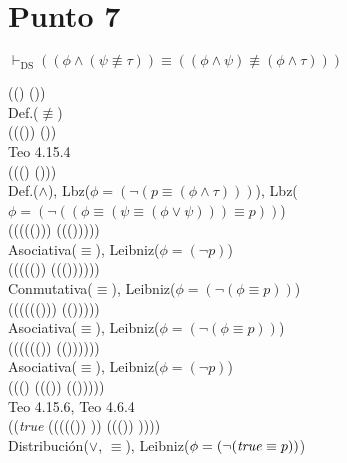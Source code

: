 \documentclass{article}
\begin{document}
\section{Punto 7}
\begin{logicenv}[2]{$\vdash_{\text{DS}} ((\phi \land (\psi \not\equiv \tau)) \equiv ((\phi \land \psi) \not\equiv (\phi \land \tau)))$}
    \begin{derivation}
            ((\phi \land \psi) \not\equiv (\phi \land \tau))\\
        Def.($\not\equiv$)\\
            ((\neg (\phi \land \psi)) \equiv (\phi \land \tau))\\
        Teo 4.15.4\\
            (\neg ((\phi \land \psi) \equiv (\phi \land \psi)))\\
        Def.($\land$), Lbz($\phi = (\neg (p \equiv (\phi \land \tau)))$), Lbz($\phi = (\neg ((\phi \equiv (\psi \equiv (\phi \lor \psi))) \equiv p))$)\\
            (\neg ((\phi \equiv (\psi \equiv (\phi \lor \psi))) \equiv (\phi \equiv (\tau \equiv (\phi \lor \tau)))))\\
        Asociativa($\equiv$), Leibniz($\phi = (\neg p)$)\\
            (\neg (\phi \equiv ((\psi \equiv (\phi \lor \psi)) \equiv (\phi \equiv (\tau \equiv (\phi \lor \tau))))))\\
        Conmutativa($\equiv$), Leibniz($\phi = (\neg (\phi \equiv p))$)\\
            (\neg (\phi \equiv ((\phi \equiv (\tau \equiv (\phi \lor \tau))) \equiv (\psi \equiv (\phi \lor \psi)))))\\
        Asociativa($\equiv$), Leibniz($\phi = (\neg (\phi \equiv p))$)\\
            (\neg (\phi \equiv (\phi \equiv ((\tau \equiv (\phi \lor \tau)) \equiv (\psi \equiv (\phi \lor \psi))))))\\
        Asociativa($\equiv$), Leibniz($\phi = (\neg p)$)\\
            (\neg ((\phi \equiv \phi) \equiv ((\tau \equiv (\phi \lor \tau)) \equiv (\psi \equiv (\phi \lor \psi)))))\\
        Teo 4.15.6, Teo 4.6.4\\
            (\neg (\textrm{\textit{true}} \equiv ((\tau \equiv ((\neg (\neg \phi)) \lor \tau)) \equiv (\psi \equiv (\neg (\neg \phi)) \lor \psi))))\\
        Distribución($\lor$, $\equiv$), Leibniz($\phi = (\neg (\textrm{\textit{true}} \equiv p))$)\\

\end{derivation}
\end{logicenv}
\end{document}
